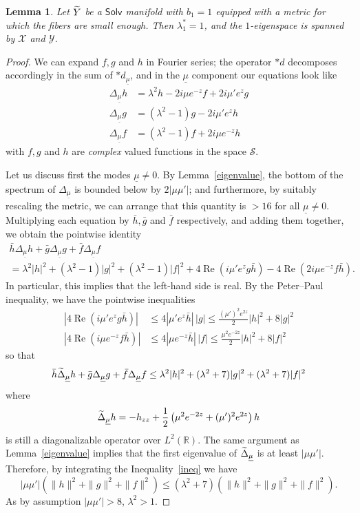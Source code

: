 \documentclass[11pt]{article}
\newtheorem{lemm}[theo]{Lemma}
\theoremstyle{definition}
\numberwithin{equation}{section}
\numberwithin{figure}{section}
\numberwithin{table}{section}
\newcommand{\Solv}{\mathsf{Solv}}
\DeclareMathOperator{\Rel}{Re}
\let\oldtilde\tilde
\renewcommand*{\tilde}[1]{\mathchoice{\widetilde{#1}}{\widetilde{#1}}{\oldtilde{#1}}{\oldtilde{#1}}}\let\oldhat\hat
\renewcommand*{\hat}[1]{\mathchoice{\widehat{#1}}{\widehat{#1}}{\oldhat{#1}}{\oldhat{#1}}}
\begin{document}
\begin{lemm}\label{cover}
Let $\tilde{Y}$ be a $\Solv$ manifold with $b_1=1$ equipped with a metric for which the fibers are small enough. Then $\lambda_1^*=1$, and the $1$-eigenspace is spanned by $\mathcal{X}$ and $\mathcal{Y}$.
\end{lemm}


\begin{proof}
We can expand $f,g$ and $h$ in Fourier series; the operator $\ast d$ decomposes accordingly in the sum of $\ast d_{\underline{\mu}}$, and in the $\underline{\mu}$ component our equations look like
\begin{align*}
\Delta_{\underline{\mu}}h&=\lambda^2 h-2i\mu e^{-z} f+2i\mu'e^z g\\
\Delta_{\underline{\mu}}g&=\left(\lambda^2-1\right)g-2i\mu'e^zh\\
\Delta_{\underline{\mu}}f&=\left(\lambda^2-1\right)f+2i\mu e^{-z}h
\end{align*}
with $f,g$ and $h$ are \emph{complex} valued functions in the space $\mathcal{S}$.


Let us discuss first the modes $\underline{\mu}\neq0$. By Lemma~\ref{eigenvalue}, the bottom of the spectrum of $\Delta_{\underline{\mu}}$ is bounded below by $2|\mu\mu'|$; and furthermore, by suitably rescaling the metric, we can arrange that this quantity is $>16$ for all $\underline{\mu}\neq0$. Multiplying each equation by $\bar{h},\bar{g}$ and $\bar{f}$ respectively, and adding them together, we obtain the pointwise identity
\begin{multline*}
\bar{h}\Delta_{\underline{\mu}}h+\bar{g}\Delta_{\underline{\mu}}g+\bar{f}\Delta_{\underline{\mu}}f\\
= \lambda^2|h|^2+\left(\lambda^2-1\right)|g|^2+\left(\lambda^2-1\right)|f|^2+4\Rel\left(i\mu'e^zg\bar{h}\right)-4\Rel\left(2i\mu e^{-z}f\bar{h}\right).
\end{multline*}
In particular, this implies that the left-hand side is real. By the Peter--Paul inequality, we have the pointwise inequalities
\begin{align*}
\left|4\Rel(i\mu'e^zg\bar{h})\right|&\leq4\left|\mu'e^z\bar{h}\right|\,|g|\leq \frac{(\mu')^2e^{2z}}{2}|h|^2+8|g|^2\\
\left|4\Rel(i\mu e^{-z}f\bar{h})\right|&\leq4\left|\mu e^{-z}\bar{h}\right|\,|f|\leq\frac{\mu^2e^{-2z}}{2}|h|^2+8|f|^2
\end{align*}
so that
\begin{equation}\label{ineq}
\bar{h}\tilde{\Delta}_{\underline{\mu}}h+\bar{g}\Delta_{\underline{\mu}}g+\bar{f}\Delta_{\underline{\mu}}f\leq \lambda^2|h|^2+(\lambda^2+7)|g|^2+(\lambda^2+7)|f|^2
\end{equation}
where
\[
\tilde{\Delta}_{\underline{\mu}}h=-h_{zz}+\frac{1}{2}\left(\mu^2 e^{-2z}+(\mu')^2e^{2z}\right)h
\]
is still a diagonalizable operator over $L^2(\mathbb{R})$. The same argument as Lemma~\ref{eigenvalue} implies that the first eigenvalue of $\tilde{\Delta}_{\underline{\mu}}$ is at least $|\mu\mu'|$. Therefore, by integrating the Inequality~\eqref{ineq} we have
\[
|\mu\mu'|\left(\|h\|^2+\|g\|^2+\|f\|^2\right)\leq \left(\lambda^2+7\right)\left(\|h\|^2+\|g\|^2+\|f\|^2\right).
\]
As by assumption $|\mu\mu'|>8$, $\lambda^2>1$.



\end{proof}
\end{document}
